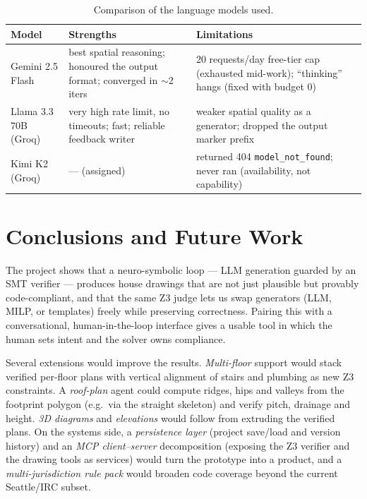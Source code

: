\documentclass{book}
\begin{document}
\begin{table}[!h]
\begin{center}
\begin{tabular}{|p{3cm}|p{5cm}|p{5cm}|}
\hline
Model & Strengths & Limitations \\
\hline
Gemini 2.5 Flash & best spatial reasoning; honoured the output format; converged in $\sim$2 iters & 20 requests/day free-tier cap (exhausted mid-work); ``thinking'' hangs (fixed with budget 0) \\ \hline
Llama 3.3 70B (Groq) & very high rate limit, no timeouts; fast; reliable feedback writer & weaker spatial quality as a generator; dropped the output marker prefix \\ \hline
Kimi K2 (Groq) & --- (assigned) & returned 404 \texttt{model\_not\_found}; never ran (availability, not capability) \\ \hline
\end{tabular}
\caption{Comparison of the language models used.}
\label{tab:llm}
\end{center}
\end{table}

\chapter{Conclusions and Future Work}
The project shows that a neuro-symbolic loop --- LLM generation guarded by an SMT verifier --- produces house drawings that are not just plausible but provably code-compliant, and that the same Z3 judge lets us swap generators (LLM, MILP, or templates) freely while preserving correctness. Pairing this with a conversational, human-in-the-loop interface gives a usable tool in which the human sets intent and the solver owns compliance.

\par\noindent Several extensions would improve the results. \emph{Multi-floor} support would stack verified per-floor plans with vertical alignment of stairs and plumbing as new Z3 constraints. A \emph{roof-plan} agent could compute ridges, hips and valleys from the footprint polygon (e.g.\ via the straight skeleton) and verify pitch, drainage and height. \emph{3D diagrams} and \emph{elevations} would follow from extruding the verified plans. On the systems side, a \emph{persistence layer} (project save/load and version history) and an \emph{MCP client--server} decomposition (exposing the Z3 verifier and the drawing tools as services) would turn the prototype into a product, and a \emph{multi-jurisdiction rule pack} would broaden code coverage beyond the current Seattle/IRC subset.
\end{document}
